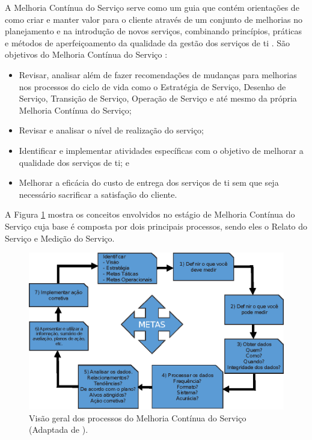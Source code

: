 A Melhoria Contínua do Serviço serve como um guia que contém orientações de como criar e manter valor para o cliente através de um conjunto de melhorias no planejamento e na introdução de novos serviços, combinando princípios, práticas e métodos de aperfeiçoamento da qualidade da gestão dos serviços de \acrshort{ti} \cite{itilimplementationfailure}. São objetivos do Melhoria Contínua do Serviço \cite{continualserviceimprovement}:

\begin{itemize}
    \item Revisar, analisar além de fazer recomendações de mudanças para melhorias nos processos do ciclo de vida como o Estratégia de Serviço, Desenho de Serviço, Transição de Serviço, Operação de Serviço e até mesmo da própria Melhoria Contínua do Serviço;
    \item Revisar e analisar o nível de realização do serviço;
    \item Identificar e implementar atividades específicas com o objetivo de melhorar a qualidade dos serviços de \acrshort{ti}; e
    \item Melhorar a eficácia do custo de entrega dos serviços de \acrshort{ti} sem que seja necessário sacrificar a satisfação do cliente.
\end{itemize}

A Figura \ref{relacao-processos-csi} mostra os conceitos envolvidos no estágio de Melhoria Contínua do Serviço cuja base é composta por dois principais processos, sendo eles o Relato do Serviço e Medição do Serviço.

\begin{figure}[!h]
  \centering
  \includegraphics[width=.70\textwidth]{figuras/processos-ci.eps} 
  \caption{Visão geral dos processos do Melhoria Contínua do Serviço (Adaptada de \cite{abreu2012implantando, continualserviceimprovement}).}
  \label{relacao-processos-csi} 
\end{figure}

